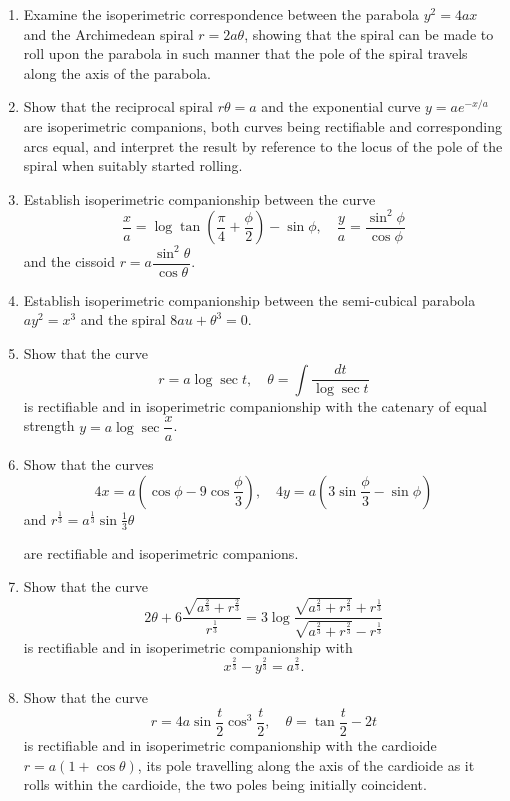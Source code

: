 \documentclass[11pt, a4paper]{article}
\begin{document}
\begin{enumerate}[leftmargin=2em]
\item Examine the isoperimetric correspondence between the parabola $y^2=4ax$ and the Archimedean spiral $r=2a\theta$, showing that the spiral can be made to roll upon the parabola in such manner that the pole of the spiral travels along the axis of the parabola.

\item Show that the reciprocal spiral $r\theta=a$ and the exponential curve $y=ae^{-x/a}$ are isoperimetric companions, both curves being rectifiable and corresponding arcs equal, and interpret the result by reference to the locus of the pole of the spiral when suitably started rolling.

\item Establish isoperimetric companionship between the curve
\[
\frac{x}{a}=\log\tan\left(\frac{\pi}{4}+\frac{\phi}{2}\right)-\sin\phi,\quad \frac{y}{a}=\frac{\sin^2\phi}{\cos\phi}
\]
and the cissoid $r=a\dfrac{\sin^2\theta}{\cos\theta}$.

\item Establish isoperimetric companionship between the semi-cubical parabola $ay^2=x^3$ and the spiral $8au+\theta^3=0$.

\item Show that the curve
\[
r=a\log\sec t,\quad \theta=\int\frac{dt}{\log\sec t}
\]
is rectifiable and in isoperimetric companionship with the catenary of equal strength $y=a\log\sec\dfrac{x}{a}$.

\item Show that the curves
\[
4x=a\left(\cos\phi-9\cos\frac{\phi}{3}\right),\quad 4y=a\left(3\sin\frac{\phi}{3}-\sin\phi\right)
\]
and $r^{\frac13}=a^{\frac13}\sin\tfrac13\theta$

are rectifiable and isoperimetric companions.

\item Show that the curve
\[
2\theta+6\frac{\sqrt{a^{\frac23}+r^{\frac23}}}{r^{\frac13}}=3\log\frac{\sqrt{a^{\frac23}+r^{\frac23}}+r^{\frac13}}{\sqrt{a^{\frac23}+r^{\frac23}}-r^{\frac13}}
\]
is rectifiable and in isoperimetric companionship with
\[
x^{\frac23}-y^{\frac23}=a^{\frac23}.
\]

\item Show that the curve
\[
r=4a\sin\frac{t}{2}\cos^3\frac{t}{2},\quad \theta=\tan\frac{t}{2}-2t
\]
is rectifiable and in isoperimetric companionship with the cardioide $r=a(1+\cos\theta)$, its pole travelling along the axis of the cardioide as it rolls within the cardioide, the two poles being initially coincident.


\end{enumerate}
\end{document}
